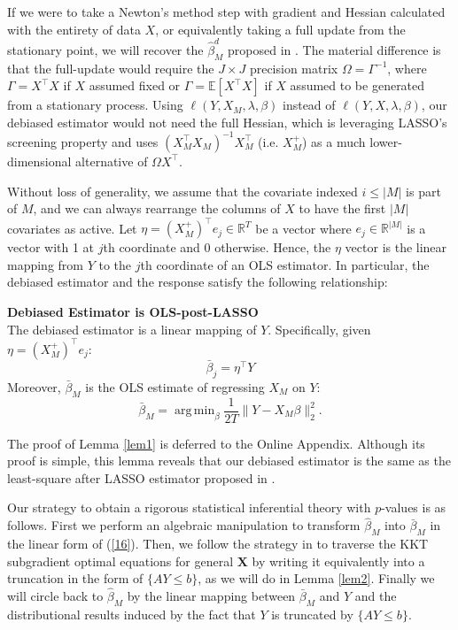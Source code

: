 \documentclass[11pt]{article}
\newcommand{\RR}{\mathbb{R}}
\newcommand{\EE}{\mathbb{E}}
\DeclareMathOperator*{\argmin}{arg\,min}
\begin{document}
If we were to take a Newton's method step with gradient and Hessian calculated with the entirety of data $X$, or equivalently taking a full update from the stationary point, we will recover the $\hat{\beta}_{M}^d$ proposed in \cite{10.1214/17-AOS1630}. The material difference is that the full-update would require the $J\times J$ precision matrix $\Omega=\Gamma^{-1}$, where $\Gamma=X^\top X$ if $X$ assumed fixed or $\Gamma=\EE[X^\top X]$ if $X$ assumed to be generated from a stationary process. Using $\ell(Y,X_M,\lambda,\beta)$ instead of $\ell(Y,X,\lambda,\beta)$, our debiased estimator would not need the full Hessian, which is leveraging LASSO's screening property and uses $(X_M^\top X_M)^{-1}X_M^\top $ (i.e. $X_M^+$) as a much lower-dimensional alternative of $\Omega X^\top $.


Without loss of generality, we assume that the covariate indexed $i\leq |M|$ is part of $M$, and we can always rearrange the columns of $X$ to have the first $|M|$ covariates as active. Let $\eta=(X_M^+)^\top e_j\in\RR^T$ be a vector where $e_j\in\RR^{|M|}$ is a vector with 1 at $j$th coordinate and 0 otherwise.
Hence, the $\eta$ vector is the linear mapping from $Y$ to the $j$th coordinate of an OLS estimator. In particular, the debiased estimator and the response satisfy the following relationship:

\begin{lemma_app}\label{lem1}
	{\bf Debiased Estimator is OLS-post-LASSO}\\
	The debiased estimator is a linear mapping of $Y$. Specifically, given $\eta=(X_M^+)^\top e_j$:
	\begin{equation}\label{16}
		\bar{\beta}_j=\eta^\top Y
	\end{equation}
	Moreover, $\bar{\beta}_{M}$ is the OLS estimate of regressing $X_M$ on $Y$:
	\begin{equation}
		\bar{\beta}_{M}=\argmin_\beta\frac{1}{2T}\|Y-X_M\beta\|_2^2.
	\end{equation}
\end{lemma_app}

The proof of Lemma \ref{lem1} is deferred to the Online Appendix. Although its proof is simple, this lemma reveals that our debiased estimator is the same as the least-square after LASSO estimator proposed in \cite{10.3150/11-BEJ410}. 


Our strategy to obtain a rigorous statistical inferential theory with $p$-values is as follows. First we perform an algebraic manipulation to transform $\hat{\beta}_M$ into $\bar{\beta}_M$ in the linear form of (\ref{16}). Then, we follow the strategy in \cite{lee2016exact} to traverse the KKT subgradient optimal equations for general $\bm{X}$ by writing it equivalently into a truncation in the form of $\{ AY\leq b\}$, as we will do in Lemma \ref{lem2}. Finally we will circle back to $\hat{\beta}_M$ by the linear mapping between $\bar{\beta}_M$ and $Y$ and the distributional results induced by the fact that $Y$ is truncated by $\{A Y\leq b\}$.
\end{document}
